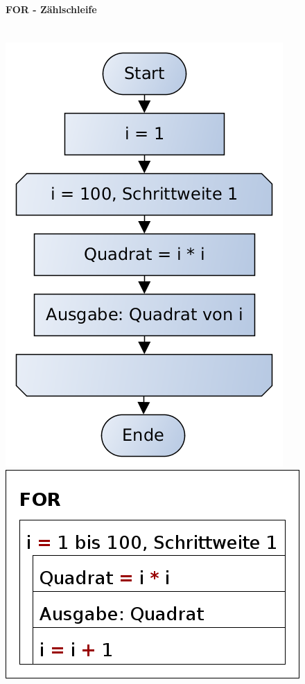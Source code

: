 \paragraph{FOR - Zählschleife}~\\

\includegraphics[scale=0.4]{1jahr_pictures/lf06prog-pic/lf06prog-for-pap.png}
\includegraphics[scale=0.4]{1jahr_pictures/lf06prog-pic/lf06prog-for-struct.png}

